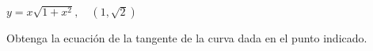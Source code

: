 \item $y = x\sqrt{1 + x^2}, \quad (1, \sqrt{2})$
\par
Obtenga la ecuación de la tangente de la curva dada en el punto indicado.
